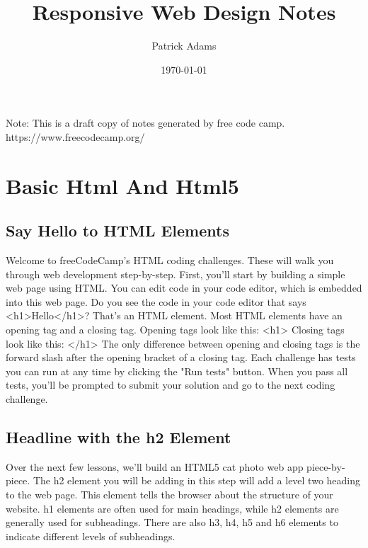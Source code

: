 \documentclass{article}%
\title{Responsive Web Design Notes}%
\author{Patrick Adams}%
\date{\today}%
\begin{document}
%
\normalsize%
\maketitle%
\newpage%
Note: This is a draft copy of notes generated by free code camp.\newline%
%
https://www.freecodecamp.org/%
\newpage%
\tableofcontents%
\section{Basic Html And Html5}%
\label{sec:BasicHtmlAndHtml5}%
\subsection{Say Hello to HTML Elements}%
\label{subsec:SayHellotoHTMLElements}%
Welcome to freeCodeCamp's HTML coding challenges. These will walk you through web development step{-}by{-}step.\newline%
First, you'll start by building a simple web page using HTML. You can edit code in your code editor, which is embedded into this web page.\newline%
Do you see the code in your code editor that says <h1>Hello</h1>? That's an HTML element.\newline%
Most HTML elements have an opening tag and a closing tag.\newline%
Opening tags look like this:\newline%
<h1>\newline%
Closing tags look like this:\newline%
</h1>\newline%
The only difference between opening and closing tags is the forward slash after the opening bracket of a closing tag.\newline%
Each challenge has tests you can run at any time by clicking the "Run tests" button. When you pass all tests, you'll be prompted to submit your solution and go to the next coding challenge.\newline%

%
\subsection{Headline with the h2 Element}%
\label{subsec:Headlinewiththeh2Element}%
Over the next few lessons, we'll build an HTML5 cat photo web app piece{-}by{-}piece.\newline%
The h2 element you will be adding in this step will add a level two heading to the web page.\newline%
This element tells the browser about the structure of your website. h1 elements are often used for main headings, while h2 elements are generally used for subheadings. There are also h3, h4, h5 and h6 elements to indicate different levels of subheadings.\newline%
\end{document}
